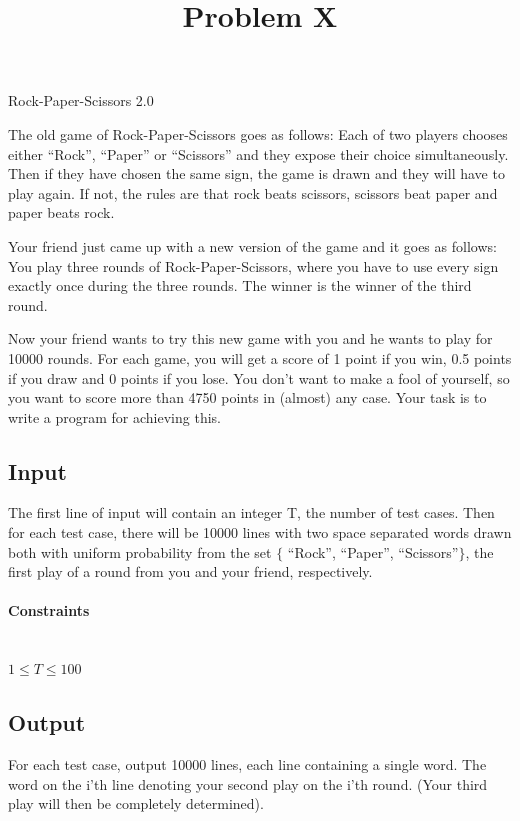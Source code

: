 \documentclass[11pt,a4paper,british]{article}
\title{Problem X}
\date{}
\begin{document}
\maketitle


\begin{center}
\Huge{Rock-Paper-Scissors 2.0}
\end{center}

The old game of Rock-Paper-Scissors goes as follows:  Each of two players chooses either ``Rock'', ``Paper'' or ``Scissors'' and they expose their choice simultaneously.  Then if they have chosen the same sign, the game is drawn and they will have to play again.  If not, the rules are that rock beats scissors, scissors beat paper and paper beats rock.

Your friend just came up with a new version of the game and it goes as follows:  You play three rounds of Rock-Paper-Scissors, where you have to use every sign exactly once during the three rounds.  The winner is the winner of the third round.  

Now your friend wants to try this new game with you and he wants to play for 10000 rounds.  For each game, you will get a score of 1 point if you win, 0.5 points if you draw and 0 points if you lose.  You don't want to make a fool of yourself, so you want to score more than 4750 points in (almost) any case.  Your task is to write a program for achieving this.

\subsection*{Input}
The first line of input will contain an integer T, the number of test cases.  Then for each test case, there will be 10000 lines with two space separated words drawn both with uniform probability from the set $\{$ ``Rock'', ``Paper'', ``Scissors''$\}$, the first play of a round from you and your friend, respectively.


\paragraph{Constraints}\ \\
$1\leq T\leq 100$\ \\

\subsection*{Output}
For each test case, output 10000 lines, each line containing a single word. The word on the i'th line denoting your second play on the i'th round.  (Your third play will then be completely determined).
\end{document}
